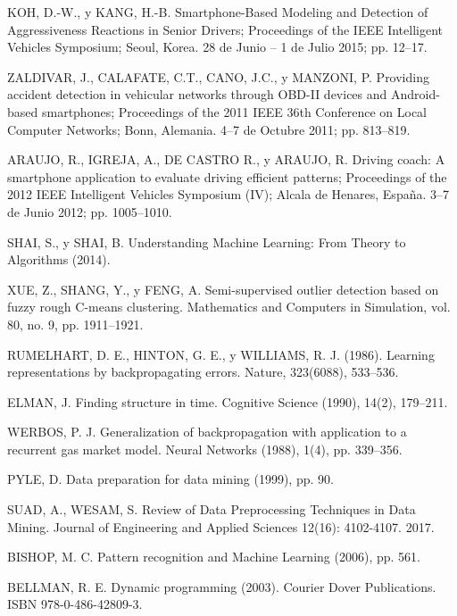 \begin{thebibliography}{50}
KOH, D.-W., y KANG, H.-B. Smartphone-Based Modeling and Detection of Aggressiveness Reactions in Senior Drivers; Proceedings of the IEEE Intelligent Vehicles Symposium; Seoul, Korea. 28 de Junio – 1 de Julio 2015; pp. 12–17.

ZALDIVAR, J., CALAFATE, C.T., CANO, J.C., y MANZONI, P. Providing accident detection in vehicular networks through OBD-II devices and Android-based smartphones; Proceedings of the 2011 IEEE 36th Conference on Local Computer Networks; Bonn, Alemania. 4–7 de Octubre 2011; pp. 813–819.

ARAUJO, R., IGREJA, A., DE CASTRO R., y ARAUJO, R. Driving coach: A smartphone application to evaluate driving efficient patterns; Proceedings of the 2012 IEEE Intelligent Vehicles Symposium (IV); Alcala de Henares, Espa\~{n}a. 3–7 de Junio 2012; pp. 1005–1010.

SHAI, S., y SHAI, B. Understanding Machine Learning: From Theory to Algorithms (2014).

XUE, Z., SHANG, Y., y FENG, A. Semi-supervised outlier detection based on fuzzy rough C-means clustering. Mathematics and Computers in Simulation, vol. 80, no. 9, pp. 1911–1921.

RUMELHART, D. E., HINTON, G. E., y WILLIAMS, R. J. (1986). Learning representations by backpropagating errors. Nature, 323(6088), 533–536.

ELMAN, J. Finding structure in time. Cognitive Science (1990), 14(2), 179–211.

WERBOS, P. J. Generalization of backpropagation with application to a recurrent gas market model. Neural Networks (1988), 1(4), pp. 339–356.

PYLE, D. Data preparation for data mining (1999), pp. 90.

SUAD, A., WESAM, S. Review of Data Preprocessing Techniques in Data Mining. Journal of Engineering and Applied Sciences 12(16): 4102-4107. 2017.

BISHOP, M. C. Pattern recognition and Machine Learning (2006), pp. 561.

 BELLMAN, R. E. Dynamic programming (2003). Courier Dover Publications. ISBN 978-0-486-42809-3.

\end{thebibliography} 
